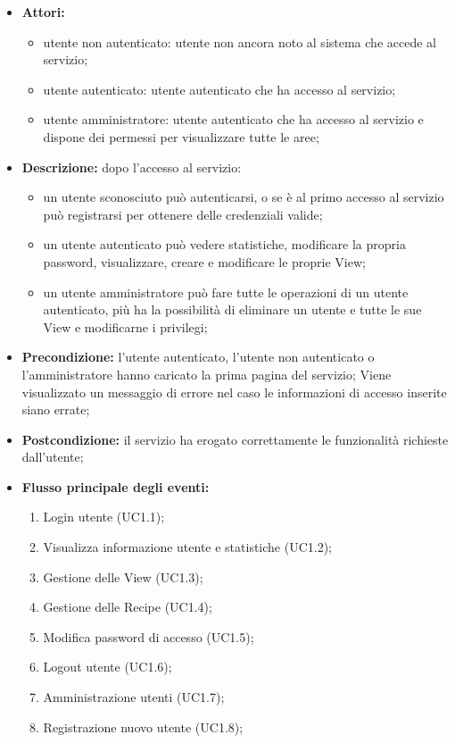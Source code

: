 \begin{itemize}
	\item \textbf{Attori:}
	\begin{itemize}
		\item utente non autenticato: utente non ancora noto al sistema che accede al servizio;
		\item utente autenticato: utente autenticato che ha accesso al servizio;
		\item utente amministratore: utente autenticato che ha accesso al servizio e dispone dei permessi per visualizzare tutte le aree;
	\end{itemize}
	\item \textbf{Descrizione:} dopo l'accesso al servizio:
	\begin{itemize}
		\item un utente sconosciuto può autenticarsi, o se è al primo accesso al servizio può registrarsi per ottenere delle credenziali valide;
		\item un utente autenticato può vedere statistiche, modificare la propria password, visualizzare, creare e modificare le proprie View;
		\item un utente amministratore può fare tutte le operazioni di un utente autenticato, più ha la possibilità di eliminare un utente e tutte le sue View e modificarne i privilegi;
	\end{itemize}
	\item \textbf{Precondizione:} l'utente autenticato, l'utente non autenticato o l'amministratore hanno caricato la prima pagina del servizio;
	Viene visualizzato un messaggio di errore nel caso le informazioni di accesso inserite siano errate;
	\item \textbf{Postcondizione:} il servizio ha erogato correttamente le funzionalità richieste dall'utente;
	\item \textbf{Flusso principale degli eventi:}
	\begin{enumerate}
		\item Login utente (UC1.1);
		\item Visualizza informazione utente e statistiche (UC1.2);
		\item Gestione delle View (UC1.3);
		\item Gestione delle Recipe (UC1.4);
		\item Modifica password di accesso (UC1.5);
		\item Logout utente (UC1.6);
		\item Amministrazione utenti (UC1.7);
		\item Registrazione nuovo utente (UC1.8);
	\end{enumerate}
\end{itemize}

